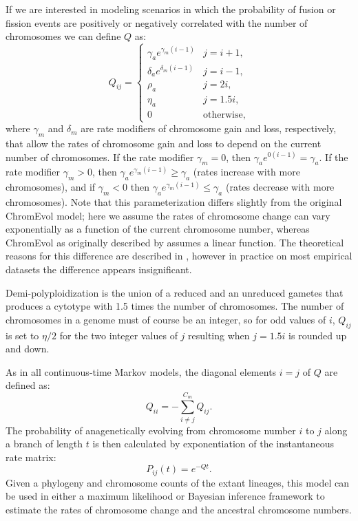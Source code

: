 If we are interested in modeling scenarios in which
the probability of fusion or fission events
are positively or negatively correlated with the number of chromosomes
we can define $Q$ as:
\begin{equation} \label{eq:anagenetic2}
Q_{ij} = 
    \begin{cases}
        \gamma_a e^{\gamma_m (i - 1)}  & j = i + 1,    \\
        \delta_a e^{\delta_m (i - 1)}     & j = i - 1,    \\
        \rho_a                                & j = 2i,       \\
        \eta_a                                 & j = 1.5i,     \\
        0                                   & \mbox{otherwise},   
    \end{cases}
\end{equation}
where $\gamma_m$ and $\delta_m$ are rate modifiers
of chromosome gain and loss, respectively,
that allow the rates of chromosome gain and loss to depend
on the current number of chromosomes.
If the rate modifier $\gamma_m = 0$, then
$\gamma_a e^{0 (i - 1)} = \gamma_a$.
If the rate modifier $\gamma_m > 0$, then
$\gamma_a e^{\gamma_m (i - 1)} \geq \gamma_a$ (\IE rates increase with more chromosomes),
and if $\gamma_m < 0$ then
$\gamma_a e^{\gamma_m (i - 1)} \leq \gamma_a$ (\IE rates decrease with more chromosomes).
Note that this parameterization differs slightly from the original
ChromEvol model; here we assume the rates of chromosome change
can vary exponentially as a function of the current chromosome number,
whereas ChromEvol as originally described by \citet{mayrose2010probabilistic} assumes
a linear function.
The theoretical reasons for this difference are described in \citet{freyman2016cladogenetic},
however in practice on most empirical datasets the difference appears insignificant.


Demi-polyploidization is the union of
a reduced and an unreduced gametes that produces a cytotype 
with 1.5 times the number of chromosomes.
The number of chromosomes in a genome must of course be an integer, 
so for odd values of $i$, $Q_{ij}$ is set to $\eta/2$
for the two integer values of $j$ resulting when $j = 1.5i$ is rounded up and down.


As in all continuous-time Markov models,
the diagonal elements $i = j$ of $Q$ are defined as:
\begin{equation}
    Q_{ii} = - \sum_{i \neq j}^{C_m} Q_{ij}.
\end{equation}
The probability
of anagenetically evolving from chromosome number $i$ to $j$ along a branch
of length $t$ is then calculated by
exponentiation of the instantaneous rate matrix:
\begin{equation} \label{eq:anagenetic_probs}
    P_{ij}(t) = e^{-Qt}.
\end{equation}
Given a phylogeny and chromosome counts of the extant lineages,
this model can be used in either a maximum likelihood or Bayesian inference
framework to estimate the rates of chromosome change and the ancestral
chromosome numbers.

